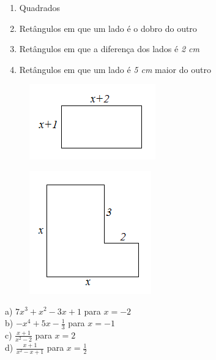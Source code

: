 \begin{exercicios}
\begin{enumerate}[label=(\textbf{\alph*)}]
\item Quadrados
\item Retângulos em que um lado é o dobro do outro
\item Retângulos em que a diferença dos lados é \textit{2 cm}
\item Retângulos em que um lado é \textit{5 cm} maior do outro
\end{enumerate}

\begin{figure}[H]
  \includegraphics{capitulos/expressoes_algebricas/media/image3.png}
  \centering
\end{figure}

\begin{figure}[H]
  \includegraphics{capitulos/expressoes_algebricas/media/image4.png}
  \centering
\end{figure}




\begin{multicols}{2}
a) $7x^3 + x^2 - 3x + 1$ para $x = -2$\\
b) $ - x^4 + 5x - \frac{1}{3}$ para $x = - 1$\\
c) $\frac{x+1}{x^2-2}$ para $x = 2$\\
d) $\frac{x+1}{x^2-x+1}$ para $x=\frac{1}{2}$
\end{multicols}\normalsize
\end{exercicios}

